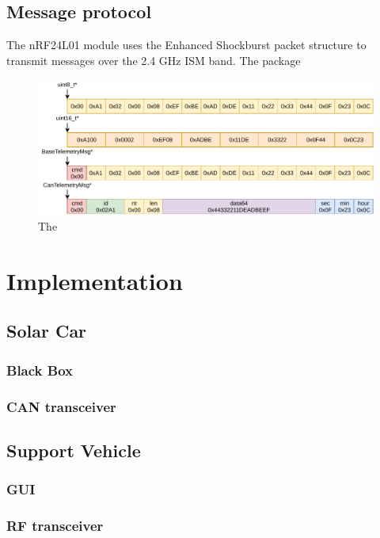 \documentclass[conference]{IEEEtran}
\begin{document}
\subsection{Message protocol}
The nRF24L01 module uses the Enhanced Shockburst packet structure to transmit messages over the 2.4 GHz ISM band. The package 

\begin{figure}
    \centering
    \includegraphics[width=\linewidth]{documentation/images/MessageTypes.pdf}
    \caption{The }
    \label{fig:my_label}
\end{figure}

\section{Implementation}

\subsection{Solar Car} 
\subsubsection{Black Box} %
\subsubsection{CAN transceiver}
\subsection{Support Vehicle}
\subsubsection{GUI} %
\subsubsection{RF transceiver}
\end{document}
